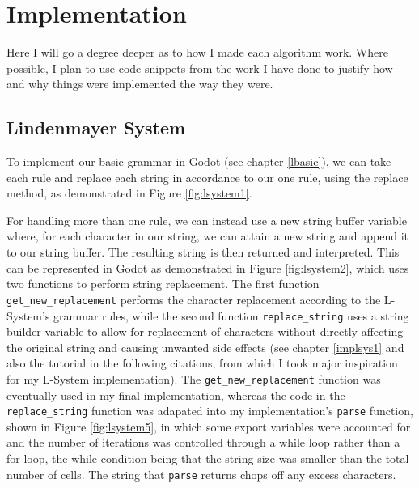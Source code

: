 \chapter{Implementation} \label{Implementation}


Here I will go a degree deeper as to how I made each algorithm work. Where possible, I plan to use code snippets from the work I have done to justify how and why things were implemented the way they were.

\section{Lindenmayer System} \label{implsys2}

To implement our basic grammar in Godot (see chapter \ref{lbasic}), we can take each rule and replace each string in accordance to our one rule, using the replace method, as demonstrated in Figure \ref{fig:lsystem1}.

For handling more than one rule, we can instead use a new string buffer variable where, for each character in our string, we can attain a new string and append it to our string buffer. The resulting string is then returned and interpreted. This can be represented in Godot as demonstrated in Figure \ref{fig:lsystem2}, which uses two functions to perform string replacement. The first function \verb|get_new_replacement| performs the character replacement according to the L-System's grammar rules, while the second function \verb|replace_string| uses a string builder variable to allow for replacement of characters without directly affecting the original string and causing unwanted side effects (see chapter \ref{implsys1} and also the tutorial in the following citations\cite{codatGD3LSystemYT}\cite{codatGD3LSystemGH}\cite{codatGD4LSystemGH}, from which I took major inspiration for my L-System implementation). The \verb|get_new_replacement| function was eventually used in my final implementation, whereas the code in the \verb|replace_string| function was adapated into my implementation's \verb|parse| function, shown in Figure \ref{fig:lsystem5}, in which some export variables were accounted for and the number of iterations was controlled through a while loop rather than a for loop, the while condition being that the string size was smaller than the total number of cells. The string that \verb|parse| returns chops off any excess characters.

